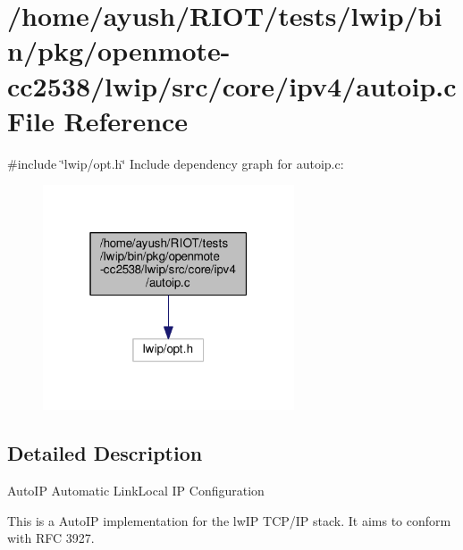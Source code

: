 \hypertarget{openmote-cc2538_2lwip_2src_2core_2ipv4_2autoip_8c}{}\section{/home/ayush/\+R\+I\+O\+T/tests/lwip/bin/pkg/openmote-\/cc2538/lwip/src/core/ipv4/autoip.c File Reference}
\label{openmote-cc2538_2lwip_2src_2core_2ipv4_2autoip_8c}
{\ttfamily \#include \char`\"{}lwip/opt.\+h\char`\"{}}\newline
Include dependency graph for autoip.\+c\+:
\nopagebreak
\begin{figure}[H]
\begin{center}
\leavevmode
\includegraphics[width=211pt]{openmote-cc2538_2lwip_2src_2core_2ipv4_2autoip_8c__incl}
\end{center}
\end{figure}


\subsection{Detailed Description}
Auto\+IP Automatic Link\+Local IP Configuration

This is a Auto\+IP implementation for the lw\+IP T\+C\+P/\+IP stack. It aims to conform with R\+FC 3927. 